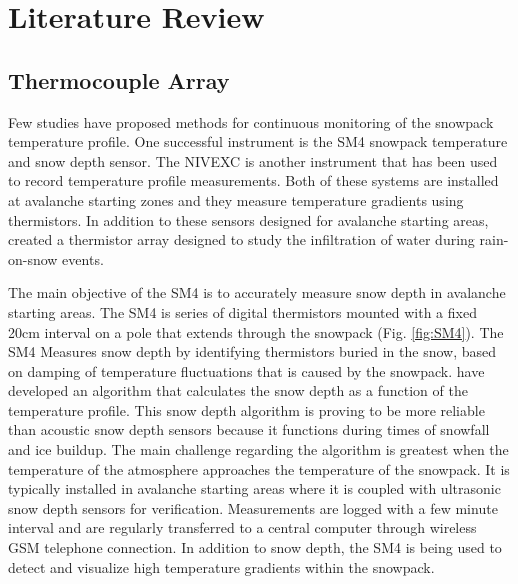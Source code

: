 \chapter{Literature Review}
\section{Thermocouple Array}
Few studies have proposed methods for continuous monitoring of the snowpack temperature profile. One successful instrument is the SM4 snowpack temperature and snow depth sensor. The NIVEXC is another instrument that has been used to record temperature profile measurements. Both of these systems are installed at avalanche starting zones and they measure temperature gradients using thermistors. In addition to these sensors designed for avalanche starting areas, \citet{conway_benedict_1994} created a thermistor array designed to study the infiltration of water during rain-on-snow events. 

The main objective of the SM4 \citep{ingolfsson2008sm4} is to accurately measure snow depth in avalanche starting areas. The SM4 is series of digital thermistors mounted with a fixed 20cm interval on a pole that extends through the snowpack (Fig. \ref{fig:SM4}). The SM4 Measures snow depth by identifying thermistors buried in the snow, based on damping of temperature fluctuations that is caused by the snowpack. \citep{ingolfsson2008sm4} have developed an algorithm that calculates the snow depth as a function of the temperature profile. This snow depth algorithm is proving to be more reliable than acoustic snow depth sensors because it functions during times of snowfall and ice buildup. The main challenge regarding the algorithm is greatest when the temperature of the atmosphere approaches the temperature of the snowpack. It is typically installed in avalanche starting areas where it is coupled with ultrasonic snow depth sensors for verification. Measurements are logged with a few minute interval and are regularly transferred to a central computer through wireless GSM telephone connection. In addition to snow depth, the SM4 is being used to detect and visualize high temperature gradients within the snowpack.

